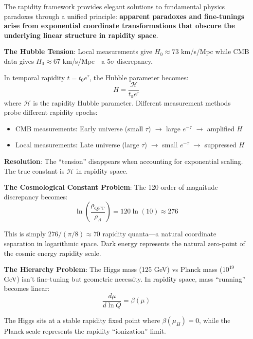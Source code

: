 \documentclass[12pt,a4paper]{article}
\begin{document}
The rapidity framework provides elegant solutions to fundamental physics paradoxes through a unified principle: \textbf{apparent paradoxes and fine-tunings arise from exponential coordinate transformations that obscure the underlying linear structure in rapidity space}.

\textbf{The Hubble Tension}:
Local measurements give $H_0 \approx 73$ km/s/Mpc while CMB data gives $H_0 \approx 67$ km/s/Mpc—a 5$\sigma$ discrepancy.

In temporal rapidity $t = t_0 e^{\tau}$, the Hubble parameter becomes:
\begin{equation}
H = \frac{\mathcal{H}}{t_0 e^{\tau}}
\end{equation}
where $\mathcal{H}$ is the rapidity Hubble parameter. Different measurement methods probe different rapidity epochs:
\begin{itemize}
\item CMB measurements: Early universe (small $\tau$) $\rightarrow$ large $e^{-\tau}$ $\rightarrow$ amplified $H$
\item Local measurements: Late universe (large $\tau$) $\rightarrow$ small $e^{-\tau}$ $\rightarrow$ suppressed $H$
\end{itemize}

\textbf{Resolution}: The ``tension'' disappears when accounting for exponential scaling. The true constant is $\mathcal{H}$ in rapidity space.

\textbf{The Cosmological Constant Problem}:
The 120-order-of-magnitude discrepancy becomes:
\begin{equation}
\ln\left(\frac{\rho_{\text{QFT}}}{\rho_{\Lambda}}\right) = 120 \ln(10) \approx 276
\end{equation}

This is simply $276/(\pi/8) \approx 70$ rapidity quanta—a natural coordinate separation in logarithmic space. Dark energy represents the natural zero-point of the cosmic energy rapidity scale.

\textbf{The Hierarchy Problem}:
The Higgs mass (125 GeV) vs Planck mass ($10^{19}$ GeV) isn't fine-tuning but geometric necessity. In rapidity space, mass ``running'' becomes linear:
\begin{equation}
\frac{d\mu}{d\ln Q} = \beta(\mu)
\end{equation}

The Higgs sits at a stable rapidity fixed point where $\beta(\mu_H) = 0$, while the Planck scale represents the rapidity ``ionization'' limit.
\end{document}
